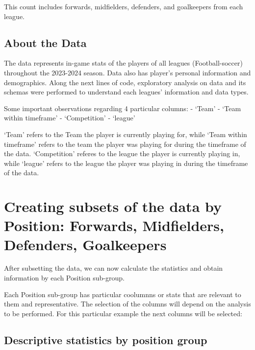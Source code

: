 \documentclass[11pt]{article}
\makeatletter
\newcommand{\boxspacing}{\kern\kvtcb@left@rule\kern\kvtcb@boxsep}
\newcommand{\prompt}[4]{
        {\ttfamily\llap{{\color{#2}[#3]:\hspace{3pt}#4}}\vspace{-\baselineskip}}
    }
\makeatother
\begin{document}
This count includes forwards, midfielders, defenders, and goalkeepers
from each league.

    \subsection{About the Data}\label{about-the-data}

    The data represents in-game stats of the players of all leagues
(Football-soccer) throughout the 2023-2024 season. Data also has
player's personal information and demographics. Along the next lines of
code, exploratory analysis on data and its schemas were performed to
understand each leagues' information and data types.

    Some important observations regarding 4 particular columns: - `Team' -
`Team within timeframe' - `Competition' - `league'

`Team' refers to the Team the player is currently playing for, while
`Team within timeframe' refers to the team the player was playing for
during the timeframe of the data. `Competition' referes to the league
the player is currently playing in, while `league' refers to the league
the player was playing in during the timeframe of the data.

    \section{Creating subsets of the data by Position: Forwards,
Midfielders, Defenders,
Goalkeepers}\label{creating-subsets-of-the-data-by-position-forwards-midfielders-defenders-goalkeepers}

    After subsetting the data, we can now calculate the statistics and
obtain information by each Position sub-group.

    Each Position sub-group has particular coolumnns or stats that are
relevant to them and representative. The selection of the columns will
depend on the analysis to be performed. For this particular example the
next columns will be selected:

    \subsection{Descriptive statistics by position
group}\label{descriptive-statistics-by-position-group}

    \begin{tcolorbox}[breakable, size=fbox, boxrule=1pt, pad at break*=1mm,colback=cellbackground, colframe=cellborder]
\prompt{In}{incolor}{34}{\boxspacing}
\begin{Verbatim}[commandchars=\\\{\}]

\end{Verbatim}
\end{tcolorbox}
\end{document}

